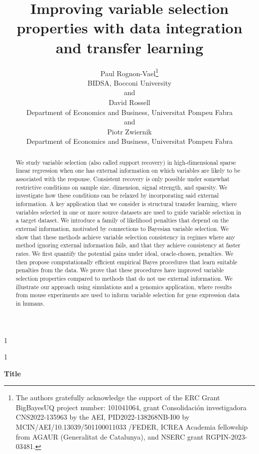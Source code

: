 \documentclass[
  12pt]{article}
\newcommand{\anon}{1}
\begin{document}
\def\spacingset#1{\renewcommand{\baselinestretch}%
{#1}\small\normalsize} \spacingset{1}




\anon
{
  \title{\bf Improving variable selection properties with data integration and transfer learning}
  \author{Paul Rognon-Vael\thanks{
    The authors gratefully acknowledge the support of the ERC Grant BigBayesUQ project number: 101041064, grant Consolidaci\'on investigadora CNS2022-135963 by the AEI, PID2022-138268NB-I00 by MCIN/AEI/10.13039/501100011033 /FEDER, ICREA Academia fellowship from AGAUR (Generalitat de Catalunya), and NSERC grant RGPIN-2023-03481.}\hspace{.2cm}\\
    BIDSA, Bocconi University\\
    and \\
    David Rossell \\
    Department of Economics and Business, Universitat Pompeu Fabra \\
    and \\
    Piotr Zwiernik \\
    Department of Economics and Business, Universitat Pompeu Fabra}
  \maketitle
} \fi

\anon
{
  \bigskip
  \bigskip
  \bigskip
  \begin{center}
    {\LARGE\bf Title}
\end{center}
  \medskip
} \fi

\bigskip
\begin{abstract}
We study variable selection (also called support recovery) in high-dimensional sparse linear regression when one has external information on which variables are likely to be associated with the response.
Consistent recovery is only possible under somewhat restrictive conditions on sample size, dimension, signal strength, and sparsity.
We investigate how these conditions can be relaxed by incorporating said external information. A key application that we consider is structural transfer learning, where variables selected in one or more source datasets are used to guide variable selection in a target dataset.
We introduce a family of likelihood penalties that depend on the external information, motivated by connections to Bayesian variable selection. We show that these methods achieve variable selection consistency in regimes where any method ignoring external information fails, and that they achieve consistency at faster rates. We first quantify the potential gains under ideal, oracle-chosen, penalties. We then propose computationally efficient empirical Bayes procedures that learn suitable penalties from the data. We prove that these procedures have improved variable selection properties compared to methods that do not use external information. We illustrate our approach using simulations and a genomics application, where results from mouse experiments are used to inform variable selection for gene expression data in humans.
\end{abstract}
\end{document}
